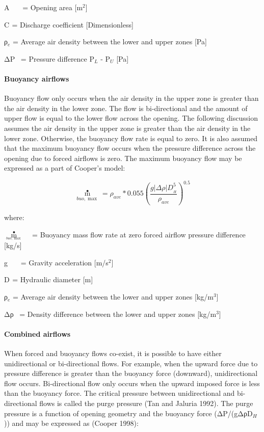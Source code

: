 A~~~ = Opening area {[}m\(^{2}\){]}

C\(_{ }\) = Discharge coefficient {[}Dimensionless{]}

ρ\(_{e}\) = Average air density between the lower and upper zones {[}Pa{]}

ΔP~ = Pressure difference P\(_{L}\) - P\(_{U}\) {[}Pa{]}

\paragraph{Buoyancy airflows}\label{buoyancy-airflows}

Buoyancy flow only occurs when the air density in the upper zone is greater than the air density in the lower zone. The flow is bi-directional and the amount of upper flow is equal to the lower flow across the opening. The following discussion assumes the air density in the upper zone is greater than the air density in the lower zone. Otherwise, the buoyancy flow rate is equal to zero. It is also assumed that the maximum buoyancy flow occurs when the pressure difference across the opening due to forced airflows is zero. The maximum buoyancy flow may be expressed as a part of Cooper's model:

\begin{equation}
{\mathop m\limits^ \bullet_{buo,\max }} = {\rho_{ave}}*0.055{\left( {\frac{{g\left| {\Delta \rho } \right|D_{_H}^5}}{{{\rho_{ave}}}}} \right)^{0.5}}
\end{equation}

where:

\({\mathop m\limits^ \bullet_{_{buo,\max }}}\) ~ = Buoyancy mass flow rate at zero forced airflow pressure difference {[}kg/s{]}

g~~~ = Gravity acceleration {[}m/s\(^{2}\){]}

D\(_{ }\) = Hydraulic diameter {[}m{]}

ρ\(_{e}\) = Average air density between the lower and upper zones {[}kg/m\(^{3}\){]}

Δρ~ = Density difference between the lower and upper zones {[}kg/m\(^{3}\){]}

\paragraph{Combined airflows}\label{combined-airflows}

When forced and buoyancy flows co-exist, it is possible to have either unidirectional or bi-directional flows. For example, when the upward force due to pressure difference is greater than the buoyancy force (downward), unidirectional flow occurs. Bi-directional flow only occurs when the upward imposed force is less than the buoyancy force. The critical pressure between unidirectional and bi-directional flows is called the purge pressure (Tan and Jaluria 1992). The purge pressure is a function of opening geometry and the buoyancy force (ΔP/(gΔρD\(_{H}\))) and may be expressed as (Cooper 1998):

